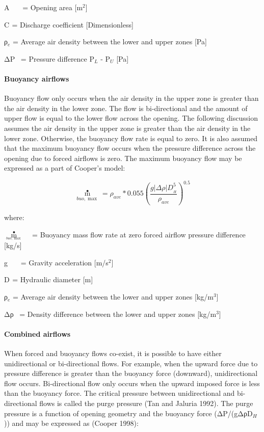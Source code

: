 A~~~ = Opening area {[}m\(^{2}\){]}

C\(_{ }\) = Discharge coefficient {[}Dimensionless{]}

ρ\(_{e}\) = Average air density between the lower and upper zones {[}Pa{]}

ΔP~ = Pressure difference P\(_{L}\) - P\(_{U}\) {[}Pa{]}

\paragraph{Buoyancy airflows}\label{buoyancy-airflows}

Buoyancy flow only occurs when the air density in the upper zone is greater than the air density in the lower zone. The flow is bi-directional and the amount of upper flow is equal to the lower flow across the opening. The following discussion assumes the air density in the upper zone is greater than the air density in the lower zone. Otherwise, the buoyancy flow rate is equal to zero. It is also assumed that the maximum buoyancy flow occurs when the pressure difference across the opening due to forced airflows is zero. The maximum buoyancy flow may be expressed as a part of Cooper's model:

\begin{equation}
{\mathop m\limits^ \bullet_{buo,\max }} = {\rho_{ave}}*0.055{\left( {\frac{{g\left| {\Delta \rho } \right|D_{_H}^5}}{{{\rho_{ave}}}}} \right)^{0.5}}
\end{equation}

where:

\({\mathop m\limits^ \bullet_{_{buo,\max }}}\) ~ = Buoyancy mass flow rate at zero forced airflow pressure difference {[}kg/s{]}

g~~~ = Gravity acceleration {[}m/s\(^{2}\){]}

D\(_{ }\) = Hydraulic diameter {[}m{]}

ρ\(_{e}\) = Average air density between the lower and upper zones {[}kg/m\(^{3}\){]}

Δρ~ = Density difference between the lower and upper zones {[}kg/m\(^{3}\){]}

\paragraph{Combined airflows}\label{combined-airflows}

When forced and buoyancy flows co-exist, it is possible to have either unidirectional or bi-directional flows. For example, when the upward force due to pressure difference is greater than the buoyancy force (downward), unidirectional flow occurs. Bi-directional flow only occurs when the upward imposed force is less than the buoyancy force. The critical pressure between unidirectional and bi-directional flows is called the purge pressure (Tan and Jaluria 1992). The purge pressure is a function of opening geometry and the buoyancy force (ΔP/(gΔρD\(_{H}\))) and may be expressed as (Cooper 1998):

